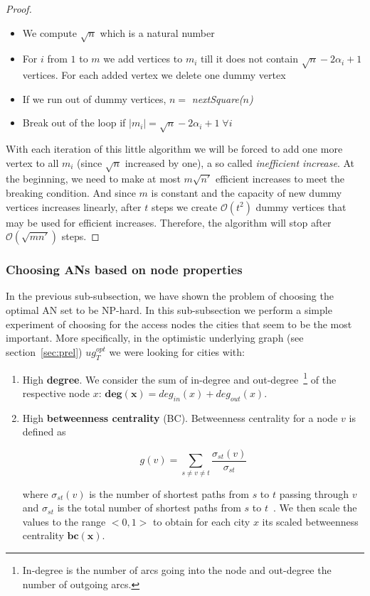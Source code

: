 \begin{proof}
			\begin{itemize}
				\item We compute $\sqrt{n}$ which is a natural number
				\item For $i$ from $1$ to $m$ we add vertices to $m_{i}$ till it does not contain $\sqrt{n} - 2\alpha_{i} + 1$ vertices. For each added vertex we delete one dummy vertex
				\item If we run out of dummy vertices, $n =$ \textit{nextSquare($n$)}
				\item Break out of the loop if $|m_{i}| = \sqrt{n} - 2\alpha_{i} + 1 \; \forall i$
			\end{itemize}
			\hspace*{\fill}
			
			\noindent With each iteration of this little algorithm we will be forced to add one more vertex to all $m_{i}$ (since $\sqrt{n}$ increased by one), a so called \textit{inefficient increase}. At the beginning, we need to make at most $m\sqrt{n'}$ efficient increases to meet the breaking condition. And since $m$ is constant and the capacity of new dummy vertices increases linearly, after $t$ steps we create $\mathcal{O}(t^{2})$ dummy vertices that may be used for efficient increases. Therefore, the algorithm will stop after $\mathcal{O}(\sqrt{mn'})$ steps.
		\end{proof}
	
	\subsubsection{Choosing ANs based on node properties}
	
		In the previous sub-subsection, we have shown the problem of choosing the optimal AN set to be NP-hard. In this sub-subsection we perform a simple experiment of choosing for the access nodes the cities that seem to be the most important. More specifically, in the optimistic underlying graph (see section~\ref{sec:prel}) $ug_{T}^{opt}$ we were looking for cities with:
		\begin{enumerate}
			\item High \textbf{degree}. We consider the sum of in-degree and out-degree~\footnote{In-degree is the number of arcs going into the node and out-degree the number of outgoing arcs.} of the respective node $x$: $\bm{deg(x)} = deg_{in}(x) + deg_{out}(x)$.
			\item High \textbf{betweenness centrality} (BC). Betweenness centrality for a node $v$ is defined as 
			
			$$g(v) = \sum_{s \neq v \neq t} \frac{\displaystyle \sigma_{st}(v)}{\displaystyle \sigma_{st}}$$
			
			where $\sigma_{st}(v)$ is the number of shortest paths from $s$ to $t$ passing through $v$ and $\sigma_{st}$ is the total number of shortest paths from $s$ to $t$~\cite{centrality01}. We then scale the values to the range $<0, 1>$ to obtain for each city $x$ its scaled betweenness centrality $\bm{bc(x)}$.
		\end{enumerate}
		\hspace*{\fill}
		
